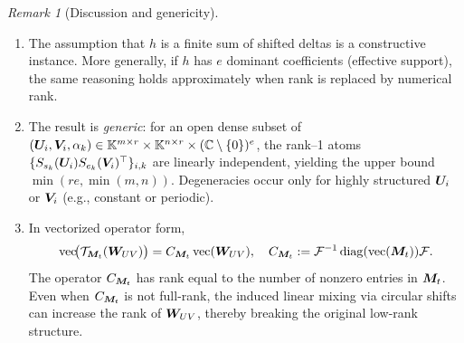 \documentclass{article}
\theoremstyle{plain}
\theoremstyle{definition}
\theoremstyle{remark}
\newtheorem{remark}[theorem]{Remark}
\begin{document}
\begin{remark}[Discussion and genericity]
\begin{enumerate}
\item 
The assumption that $h$ is a finite sum of shifted deltas is a constructive instance.  
More generally, if $h$ has $e$ dominant coefficients (effective support), the same reasoning holds approximately when rank is replaced by numerical rank.

\item 
The result is \emph{generic}: for an open dense subset of $({\bm{U}}_i,{\bm{V}}_i,\alpha_k)\in\mathbb{K}^{m\times r}\times\mathbb{K}^{n\times r}\times(\mathbb{C}\setminus\{0\})^e$, the rank--1 atoms $\{S_{s_k}({\bm{U}}_i)S_{e_k}({\bm{V}}_i)^\top\}_{i,k}$ are linearly independent, yielding the upper bound $\min(re,\min(m,n))$.  
Degeneracies occur only for highly structured ${\bm{U}}_i$ or ${\bm{V}}_i$ (e.g., constant or periodic).

\item 
In vectorized operator form,
\begin{align}
\mathrm{vec}\!\big(\mathcal{T}_{{\bm{M}}_t}({\bm{W}}_{UV})\big)
   = C_{{\bm{M}}_t}\,\mathrm{vec}({\bm{W}}_{UV}),
   \quad 
   C_{{\bm{M}}_t} := \mathcal{F}^{-1} \operatorname{diag}(\mathrm{vec}({\bm{M}}_t)) \mathcal{F}. \notag
\end{align}
The operator $C_{{\bm{M}}_t}$ has rank equal to the number of nonzero entries in ${\bm{M}}_t$.  
Even when $C_{{\bm{M}}_t}$ is not full-rank, the induced linear mixing via circular shifts can increase the rank of ${\bm{W}}_{UV}$, thereby breaking the original low-rank structure.
\end{enumerate}
\end{remark}






\end{document}
